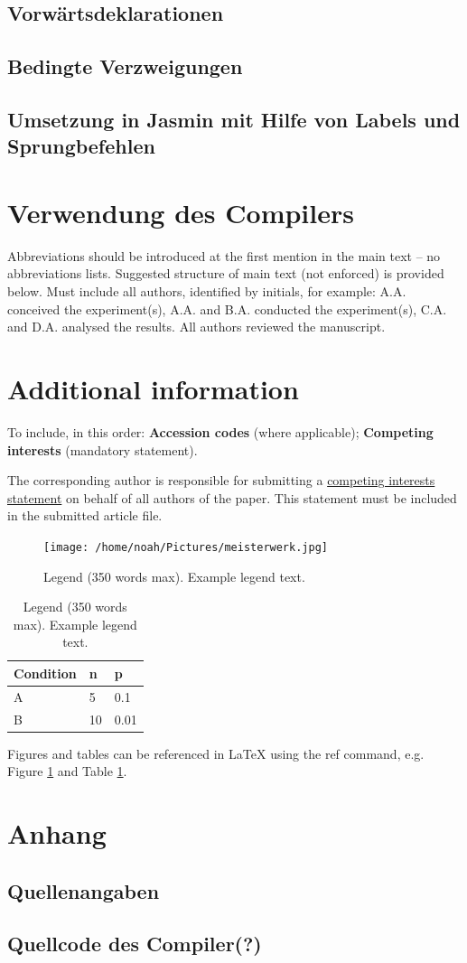 \documentclass[12pt, a4paper, oneside, ngerman]{article}
\begin{document}
\subsection*{Vorwärtsdeklarationen}

\subsection{Bedingte Verzweigungen}
\subsection*{Umsetzung in Jasmin mit Hilfe von Labels und Sprungbefehlen}



\pagebreak
\section{Verwendung des Compilers}
Abbreviations should be introduced at the first mention in the main text – no abbreviations lists. Suggested structure of main text (not enforced) is provided below.
Must include all authors, identified by initials, for example:
A.A. conceived the experiment(s),  A.A. and B.A. conducted the experiment(s), C.A. and D.A. analysed the results.  All authors reviewed the manuscript.

\section*{Additional information}

To include, in this order: \textbf{Accession codes} (where applicable); \textbf{Competing interests} (mandatory statement).

The corresponding author is responsible for submitting a \href{http://www.nature.com/srep/policies/index.html#competing}{competing interests statement} on behalf of all authors of the paper. This statement must be included in the submitted article file.

\begin{figure}[ht]
\centering
\texttt{[image: /home/noah/Pictures/meisterwerk.jpg]}
\caption{Legend (350 words max). Example legend text.}
\label{fig:stream}
\end{figure}

\begin{table}[ht]
\centering
\begin{tabular}{|l|l|l|}
\hline
Condition & n & p \\
\hline
A & 5 & 0.1 \\
\hline
B & 10 & 0.01 \\
\hline
\end{tabular}
\caption{\label{tab:example}Legend (350 words max). Example legend text.}
\end{table}

Figures and tables can be referenced in LaTeX using the ref command, e.g. Figure \ref{fig:stream} and Table \ref{tab:example}.


\section{Anhang}
\subsection{Quellenangaben}

\subsection{Quellcode des Compiler(?)}
\end{document}
